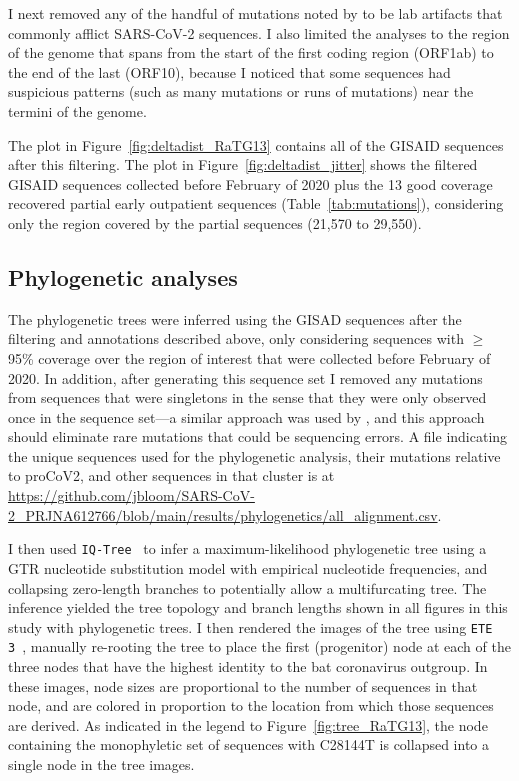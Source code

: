\documentclass[9pt,twocolumn,twoside]{gsajnl_modified}
\begin{document}
{I next removed any of the handful of mutations noted by \citet{turakhia2020stability} to be lab artifacts that commonly afflict SARS-CoV-2 sequences.
I also limited the analyses to the region of the genome that spans from the start of the first coding region (ORF1ab) to the end of the last (ORF10), because I noticed that some sequences had suspicious patterns (such as many mutations or runs of mutations) near the termini of the genome.

The plot in Figure~\ref{fig:deltadist_RaTG13} contains all of the GISAID sequences after this filtering.
The plot in Figure~\ref{fig:deltadist_jitter} shows the filtered GISAID sequences collected before February of 2020 plus the 13 good coverage recovered partial early outpatient sequences (Table~\ref{tab:mutations}), considering only the region covered by the partial sequences (21,570 to 29,550).

\subsection{Phylogenetic analyses}
The phylogenetic trees were inferred using the GISAD sequences after the filtering and annotations described above, only considering sequences with $\ge$95\% coverage over the region of interest that were collected before February of 2020.
In addition, after generating this sequence set I removed any mutations from sequences that were singletons in the sense that they were only observed once in the sequence set---a similar approach was used by \citet{kumar2021evolutionary}, and this approach should eliminate rare mutations that could be sequencing errors.
A file indicating the unique sequences used for the phylogenetic analysis, their mutations relative to proCoV2, and other sequences in that cluster is at \url{https://github.com/jbloom/SARS-CoV-2_PRJNA612766/blob/main/results/phylogenetics/all_alignment.csv}.

I then used \texttt{IQ-Tree}~\citep{minh2020iq} to infer a maximum-likelihood phylogenetic tree using a GTR nucleotide substitution model with empirical nucleotide frequencies, and collapsing zero-length branches to potentially allow a multifurcating tree.
The inference yielded the tree topology and branch lengths shown in all figures in this study with phylogenetic trees.
I then rendered the images of the tree using \texttt{ETE 3}~\citep{huerta2016ete}, manually re-rooting the tree to place the first (progenitor) node at each of the three nodes that have the highest identity to the bat coronavirus outgroup.
In these images, node sizes are proportional to the number of sequences in that node, and are colored in proportion to the location from which those sequences are derived.
As indicated in the legend to Figure~\ref{fig:tree_RaTG13}, the node containing the monophyletic set of sequences with C28144T is collapsed into a single node in the tree images.

}
\end{document}
